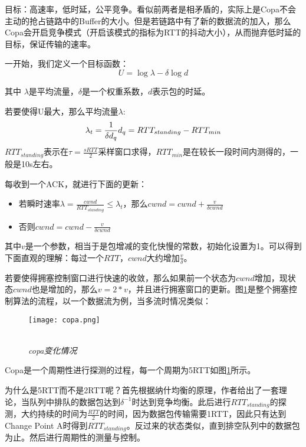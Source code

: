 \documentclass[a4paper, 12pt, UTF8]{ctexart}
\begin{document}
\par 目标：高速率，低时延，公平竞争。看似前两者是相矛盾的，实际上是Copa不会主动的抢占链路中的Buffer的大小。但是若链路中有了新的数据流的加入，那么Copa会开启竞争模式（开启该模式的指标为RTT的抖动大小），从而抛弃低时延的目标，保证传输的速率。

\par 一开始，我们定义一个目标函数：
$$
U = \log\lambda-\delta \log d
$$
\par 其中 $\lambda$是平均流量，$\delta$是一个权重系数，$d$表示包的时延。

\par 若要使得U最大，那么平均流量$\lambda$:
$$
\lambda_t = \frac{1}{\delta d_q}
\\
d_q = RTT_{standing}-RTT_{min}
$$
$RTT_{standing}$表示在$ \tau = \frac{sRTT}{2}$采样窗口求得，$RTT_{min}$是在较长一段时间内测得的，一般是10s左右。

\par 每收到一个ACK，就进行下面的更新：\\
\begin{itemize}
	\item 若瞬时速率$\lambda = \frac{cwnd}{RTT_{standing}}\le \lambda_{t}$，那么$cwnd = cwnd+\frac{v}{\delta cwnd}$
	\item 否则$cwnd = cwnd - \frac{v}{\delta cwnd}$\\
\end{itemize}

\par 其中$v$是一个参数，相当于是包增减的变化快慢的常数，初始化设置为1。可以得到下面直观的理解：每过一个$RTT$，$cwnd$大约增加$\frac{v}{\delta}$。

\par 若要使得拥塞控制窗口进行快速的收敛，那么如果前一个状态为$cwnd$增加，现状态$cwnd$也是增加的，那么$v=2*v$，并且进行拥塞窗口的更新。图\ref{fig:copa algorithm}是整个拥塞控制算法的流程，以一个数据流为例，当多流时情况类似：
\begin{figure}[H]
	\centering \texttt{[image: copa.png]}
	\\ \hspace*{\fill} \\
	\caption{\em copa变化情况}
	\label{fig:copa algorithm}
\end{figure}

\par Copa是一个周期性进行探测的过程，每一个周期为5RTT如图\ref{fig:copa algorithm}所示。

\par 为什么是5RTT而不是2RTT呢？首先根据纳什均衡的原理，作者给出了一套理论，当队列中排队的数据包达到$\delta^{-1}$时达到竞争均衡。此后进行$RTT_{standing}$的探测，大约持续的时间为$\frac{RTT}{2}$的时间，因为数据包传输需要1RTT，因此只有达到Change Point A时得到$RTT_{standing}$。反过来的状态类似，直到排空队列中的数据包为止。然后进行周期性的测量与控制。
\end{document}
